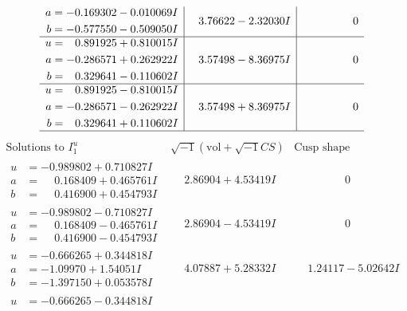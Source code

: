 \documentclass[1p]{elsarticle_modified}
\theoremstyle{definition}
\newcommand{\I}{\sqrt{-1}}
\begin{document}
$$\begin{array}{c|c|c}
\begin{aligned}
a &= -0.169302 - 0.010069 I \\
b &= -0.577550 - 0.509050 I\end{aligned}
 & \phantom{-}3.76622 - 2.32030 I & \phantom{-0.000000 } 0 \\ \hline\begin{aligned}
u &= \phantom{-}0.891925 + 0.810015 I \\
a &= -0.286571 + 0.262922 I \\
b &= \phantom{-}0.329641 - 0.110602 I\end{aligned}
 & \phantom{-}3.57498 - 8.36975 I & \phantom{-0.000000 } 0 \\ \hline\begin{aligned}
u &= \phantom{-}0.891925 - 0.810015 I \\
a &= -0.286571 - 0.262922 I \\
b &= \phantom{-}0.329641 + 0.110602 I\end{aligned}
 & \phantom{-}3.57498 + 8.36975 I & \phantom{-0.000000 } 0\\
 \hline 
 \end{array}$$\newpage$$\begin{array}{c|c|c}  
\text{Solutions to }I^u_{1}& \I (\text{vol} + \sqrt{-1}CS) & \text{Cusp shape}\\
 \hline 
\begin{aligned}
u &= -0.989802 + 0.710827 I \\
a &= \phantom{-}0.168409 + 0.465761 I \\
b &= \phantom{-}0.416900 + 0.454793 I\end{aligned}
 & \phantom{-}2.86904 + 4.53419 I & \phantom{-0.000000 } 0 \\ \hline\begin{aligned}
u &= -0.989802 - 0.710827 I \\
a &= \phantom{-}0.168409 - 0.465761 I \\
b &= \phantom{-}0.416900 - 0.454793 I\end{aligned}
 & \phantom{-}2.86904 - 4.53419 I & \phantom{-0.000000 } 0 \\ \hline\begin{aligned}
u &= -0.666265 + 0.344818 I \\
a &= -1.09970 + 1.54051 I \\
b &= -1.397150 + 0.053578 I\end{aligned}
 & \phantom{-}4.07887 + 5.28332 I & \phantom{-}1.24117 - 5.02642 I \\ \hline\begin{aligned}
u &= -0.666265 - 0.344818 I \\

\end{aligned}
\end{array}$$
\end{document}
